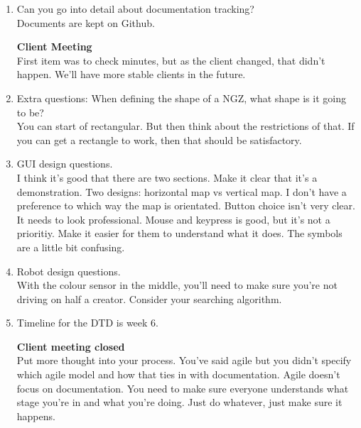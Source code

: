 \documentclass{article}
\begin{document}
\begin{enumerate}
\item Can you go into detail about documentation tracking?\\
Documents are kept on Github.

\textbf{Client Meeting}\\
First item was to check minutes, but as the client changed, that didn't happen. We'll have more stable clients in the future.

\item Extra questions:
When defining the shape of a NGZ, what shape is it going to be?\\
You can start of rectangular. But then think about the restrictions of that. If you can get a rectangle to work, then that should be satisfactory.

\item GUI design questions.\\
I think it's good that there are two sections. Make it clear that it's a demonstration. Two designs: horizontal map vs vertical map. I don't have a preference to which way the map is orientated. Button choice isn't very clear. It needs to look professional. Mouse and keypress is good, but it's not a prioritiy. Make it easier for them to understand what it does. The symbols are a little bit confusing.

\item Robot design questions.\\
With the colour sensor in the middle, you'll need to make sure you're not driving on half a creator. Consider your searching algorithm.

\item Timeline for the DTD is week 6. 

\textbf{Client meeting closed}\\

Put more thought into your process. You've said agile but you didn't specify which agile model and how that ties in with documentation. Agile doesn't focus on documentation. You need to make sure everyone understands what stage you're in and what you're doing. Just do whatever, just make sure it happens. 

\end{enumerate}
\end{document}

